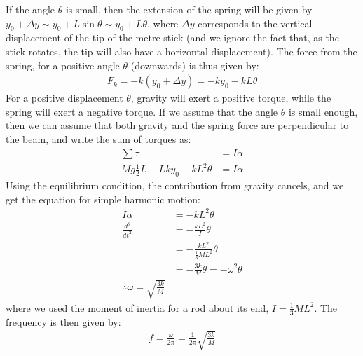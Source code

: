 \begin{solution}
If the angle $\theta$ is small, then the extension of the spring will be given by $y_0+\Delta y\sim y_0+L\sin\theta\sim y_0+L\theta$, where $\Delta y$ corresponds to the vertical displacement of the tip of the metre stick (and we ignore the fact that, as the stick rotates, the tip will also have a horizontal displacement). The force from the spring, for a positive angle $\theta$ (downwards) is thus given by:
\begin{align*}
F_k = -k(y_0+\Delta y) = -ky_0-kL\theta
\end{align*}
For a positive displacement $\theta$, gravity will exert a positive torque, while the spring will exert a negative torque. If we assume that the angle $\theta$ is small enough, then we can assume that both gravity and the spring force are perpendicular to the beam, and write the sum of torques as:
\begin{align*}
\sum \tau &= I\alpha\\
Mg\frac{1}{2}L-Lky_0-kL^2\theta &=I\alpha
\end{align*}
Using the equilibrium condition, the contribution from gravity cancels, and we get the equation for simple harmonic motion:
\begin{align*}
I\alpha &=-kL^2\theta \\
\frac{d^\theta}{dt^2}&=-\frac{kL^2}{I}\theta\\
&=-\frac{kL^2}{\frac{1}{3}ML^2}\theta\\
&=-\frac{3k}{M}\theta=-\omega^2\theta\\
\therefore \omega = \sqrt{\frac{3k}{M}}
\end{align*}
where we used the moment of inertia for a rod about its end, $I=\frac{1}{3}ML^2$. The frequency is then given by:
\begin{align*}
f = \frac{\omega}{2\pi}=\frac{1}{2\pi}\sqrt{\frac{3k}{M}}
\end{align*}
\end{solution}

